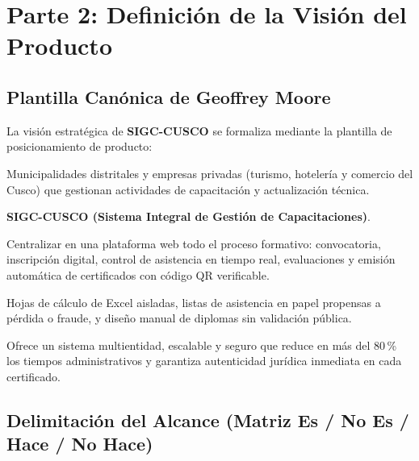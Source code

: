 
\section{Parte 2: Definición de la Visión del Producto}

\subsection{Plantilla Canónica de Geoffrey Moore}
La visión estratégica de \textbf{SIGC-CUSCO} se formaliza mediante la plantilla de posicionamiento de producto:

\begin{tcolorbox}[colback=blue!4!white, colframe=blue!70!black, title=\textbf{Declaración Oficial de Visión -- SIGC-CUSCO}, arc=1.5mm]
\begin{description}\setlength\itemsep{0.2em}
    \item[\textbf{Para:}] Municipalidades distritales y empresas privadas (turismo, hotelería y comercio del Cusco) que gestionan actividades de capacitación y actualización técnica.
    \item[\textbf{El sistema:}] \textbf{SIGC-CUSCO (Sistema Integral de Gestión de Capacitaciones)}.
    \item[\textbf{Que permite:}] Centralizar en una plataforma web todo el proceso formativo: convocatoria, inscripción digital, control de asistencia en tiempo real, evaluaciones y emisión automática de certificados con código QR verificable.
    \item[\textbf{A diferencia de:}] Hojas de cálculo de Excel aisladas, listas de asistencia en papel propensas a pérdida o fraude, y diseño manual de diplomas sin validación pública.
    \item[\textbf{Nuestro producto:}] Ofrece un sistema multientidad, escalable y seguro que reduce en más del 80\,\% los tiempos administrativos y garantiza autenticidad jurídica inmediata en cada certificado.
\end{description}
\end{tcolorbox}

\subsection{Delimitación del Alcance (Matriz Es / No Es / Hace / No Hace)}

